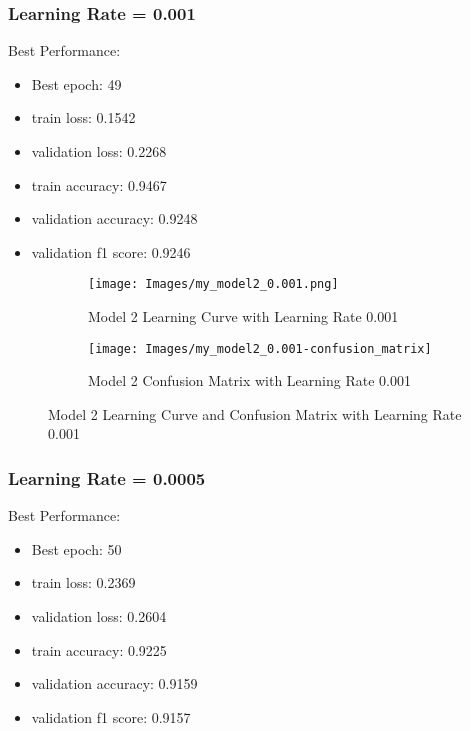 \documentclass{article}
\begin{document}
\subsubsection{Learning Rate = 0.001}
Best Performance:
\begin{itemize}
    \item Best epoch: 49
    \item train loss: 0.1542
    \item validation loss: 0.2268
    \item train accuracy: 0.9467
    \item validation accuracy: 0.9248
    \item validation f1 score: 0.9246
\end{itemize}

\begin{figure}[h]
    \begin{subfigure}{0.5\textwidth}
        \texttt{[image: Images/my\_model2\_0.001.png]} 
        \caption{Model 2 Learning Curve with Learning Rate 0.001}
        \label{fig:model2_lr_0.001}
    \end{subfigure}
    \begin{subfigure}{0.5\textwidth}
        \texttt{[image: Images/my\_model2\_0.001-confusion\_matrix]} 
        \caption{Model 2 Confusion Matrix with Learning Rate 0.001}
        \label{fig:model2_lr_0.001_confusion_matrix}
    \end{subfigure}
    \caption{Model 2 Learning Curve and Confusion Matrix with Learning Rate 0.001}
    \label{fig:model2_lr_0.001_combined}
\end{figure}

\subsubsection{Learning Rate = 0.0005}
Best Performance:
\begin{itemize}
    \item Best epoch: 50
    \item train loss: 0.2369
    \item validation loss: 0.2604
    \item train accuracy: 0.9225
    \item validation accuracy: 0.9159
    \item validation f1 score: 0.9157
\end{itemize}
\end{document}
